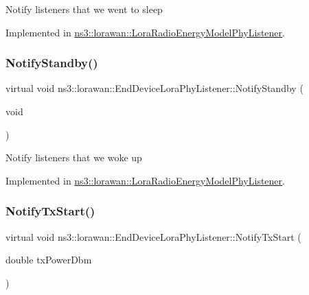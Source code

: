 Notify listeners that we went to sleep 

Implemented in \hyperlink{classns3_1_1lorawan_1_1LoraRadioEnergyModelPhyListener_ac4e0739b8ae8f0ed5a94eb8c5e830641}{ns3\+::lorawan\+::\+Lora\+Radio\+Energy\+Model\+Phy\+Listener}.

\mbox{\label{classns3_1_1lorawan_1_1EndDeviceLoraPhyListener_ab7e6540205cc6a0cefbe226bda967187}} 
\subsubsection{\texorpdfstring{Notify\+Standby()}{NotifyStandby()}}
{\footnotesize\ttfamily virtual void ns3\+::lorawan\+::\+End\+Device\+Lora\+Phy\+Listener\+::\+Notify\+Standby (\begin{DoxyParamCaption}\item[{void}]{ }\end{DoxyParamCaption})\hspace{0.3cm}{\ttfamily [pure virtual]}}

Notify listeners that we woke up 

Implemented in \hyperlink{classns3_1_1lorawan_1_1LoraRadioEnergyModelPhyListener_ad5ce1283ba5c34384307338c24446876}{ns3\+::lorawan\+::\+Lora\+Radio\+Energy\+Model\+Phy\+Listener}.

\mbox{\label{classns3_1_1lorawan_1_1EndDeviceLoraPhyListener_abf3943484dc182ade9f180cd806d43f4}} 
\subsubsection{\texorpdfstring{Notify\+Tx\+Start()}{NotifyTxStart()}}
{\footnotesize\ttfamily virtual void ns3\+::lorawan\+::\+End\+Device\+Lora\+Phy\+Listener\+::\+Notify\+Tx\+Start (\begin{DoxyParamCaption}\item[{double}]{tx\+Power\+Dbm }\end{DoxyParamCaption})\hspace{0.3cm}{\ttfamily [pure virtual]}}

